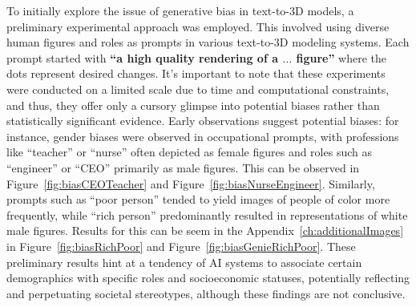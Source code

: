 To initially explore the issue of generative bias in text-to-3D models, a preliminary experimental approach was employed. This involved using diverse human figures and roles as prompts in various text-to-3D modeling systems. Each prompt started with \textbf{``a high quality rendering of a \(\ldots\) figure''} where the dots represent desired changes. It's important to note that these experiments were conducted on a limited scale due to time and computational constraints, and thus, they offer only a cursory glimpse into potential biases rather than statistically significant evidence. Early observations suggest potential biases: for instance, gender biases were observed in occupational prompts, with professions like ``teacher'' or ``nurse'' often depicted as female figures and roles such as ``engineer'' or ``CEO'' primarily as male figures. This can be observed in Figure~\ref{fig:biasCEOTeacher} and Figure~\ref{fig:biasNurseEngineer}. Similarly, prompts such as ``poor person'' tended to yield images of people of color more frequently, while ``rich person'' predominantly resulted in representations of white male figures. Results for this can be seem in the Appendix~\ref{ch:additionalImages} in Figure~\ref{fig:biasRichPoor} and Figure~\ref{fig:biasGenieRichPoor}. These preliminary results hint at a tendency of AI systems to associate certain demographics with specific roles and socioeconomic statuses, potentially reflecting and perpetuating societal stereotypes, although these findings are not conclusive.

